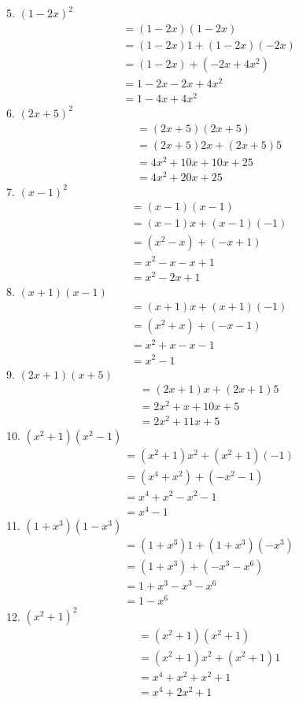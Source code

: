 \documentclass[12pt]{article}
\begin{document}
5. $(1-2x)^2$
\begin{align*}
&=(1-2x)(1-2x) \\
&=(1-2x)1+(1-2x)(-2x) \\
&=(1-2x)+(-2x+4x^2) \\
&=1-2x-2x+4x^2 \\
&=1-4x+4x^2
\end{align*}
6. $(2x+5)^2$
\begin{align*}
&=(2x+5)(2x+5) \\
&=(2x+5)2x+(2x+5)5 \\
&=4x^2+10x+10x+25 \\
&=4x^2+20x+25
\end{align*}
7. $(x-1)^2$
\begin{align*}
&=(x-1)(x-1) \\
&=(x-1)x+(x-1)(-1) \\
&=(x^2-x)+(-x+1) \\
&=x^2-x-x+1 \\
&=x^2-2x+1
\end{align*}
8. $(x+1)(x-1)$
\begin{align*}
&=(x+1)x+(x+1)(-1) \\
&=(x^2+x)+(-x-1) \\
&=x^2+x-x-1 \\
&=x^2-1
\end{align*}
9. $(2x+1)(x+5)$
\begin{align*}
&=(2x+1)x+(2x+1)5 \\
&=2x^2+x+10x+5 \\
&=2x^2+11x+5
\end{align*}
10. $(x^2+1)(x^2-1)$
\begin{align*}
&=(x^2+1)x^2+(x^2+1)(-1) \\
&=(x^4+x^2)+(-x^2-1) \\
&=x^4+x^2-x^2-1 \\
&=x^4-1
\end{align*}
11. $(1+x^3)(1-x^3)$
\begin{align*}
&=(1+x^3)1+(1+x^3)(-x^3) \\
&=(1+x^3)+(-x^3-x^6) \\
&=1+x^3-x^3-x^6 \\
&=1-x^6
\end{align*}
12. $(x^2+1)^2$
\begin{align*}
&=(x^2+1)(x^2+1) \\
&=(x^2+1)x^2+(x^2+1)1 \\
&=x^4+x^2+x^2+1 \\
&=x^4+2x^2+1
\end{align*}
\end{document}
